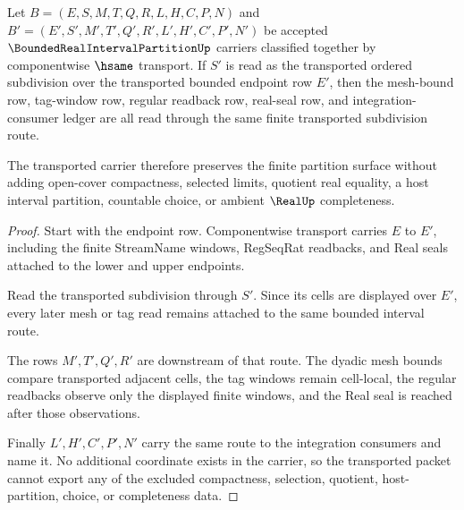 \begin{theorem}
\label{thm:bounded-real-interval-partition-transport-stability}
Let $B=(E,S,M,T,Q,R,L,H,C,P,N)$ and $B'=(E',S',M',T',Q',R',L',H',C',P',N')$ be accepted $\BoundedRealIntervalPartitionUp$ carriers classified together by componentwise $\hsame$ transport. If $S'$ is read as the transported ordered subdivision over the transported bounded endpoint row $E'$, then the mesh-bound row, tag-window row, regular readback row, real-seal row, and integration-consumer ledger are all read through the same finite transported subdivision route.

The transported carrier therefore preserves the finite partition surface without adding open-cover compactness, selected limits, quotient real equality, a host interval partition, countable choice, or ambient $\RealUp$ completeness.
\end{theorem}
\begin{proof}
Start with the endpoint row. Componentwise transport carries $E$ to $E'$, including the finite StreamName windows, RegSeqRat readbacks, and Real seals attached to the lower and upper endpoints.

Read the transported subdivision through $S'$. Since its cells are displayed over $E'$, every later mesh or tag read remains attached to the same bounded interval route.

The rows $M',T',Q',R'$ are downstream of that route. The dyadic mesh bounds compare transported adjacent cells, the tag windows remain cell-local, the regular readbacks observe only the displayed finite windows, and the Real seal is reached after those observations.

Finally $L',H',C',P',N'$ carry the same route to the integration consumers and name it. No additional coordinate exists in the carrier, so the transported packet cannot export any of the excluded compactness, selection, quotient, host-partition, choice, or completeness data.
\end{proof}

